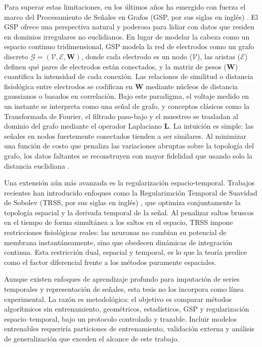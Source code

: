 Para superar estas limitaciones, en los últimos años ha emergido con fuerza el marco del Procesamiento de Señales en Grafos (GSP, por sus siglas en inglés) \cite{shuman2013,ortega2018}. El GSP ofrece una perspectiva natural y poderosa para lidiar con datos que residen en dominios irregulares no euclidianos. En lugar de modelar la cabeza como un espacio continuo tridimensional, GSP modela la red de electrodos como un grafo discreto $\mathcal{G} = (\mathcal{V}, \mathcal{E}, \mathbf{W})$, donde cada electrodo es un nodo ($\mathcal{V}$), las aristas ($\mathcal{E}$) definen qué pares de electrodos están conectados, y la matriz de pesos ($\mathbf{W}$) cuantifica la intensidad de cada conexión. Las relaciones de similitud o distancia fisiológica entre electrodos se codifican en $\mathbf{W}$ mediante núcleos de distancia gaussianos o basados en correlación.
Bajo este paradigma, el voltaje medido en un instante se interpreta como una señal de grafo, y conceptos clásicos como la Transformada de Fourier, el filtrado paso-bajo y el muestreo se trasladan al dominio del grafo mediante el operador Laplaciano $\mathbf{L}$. La intuición es simple: las señales en nodos fuertemente conectados tienden a ser similares. Al minimizar una función de costo que penaliza las variaciones abruptas sobre la topología del grafo, los datos faltantes se reconstruyen con mayor fidelidad que usando solo la distancia euclidiana \cite{narang2013}.

Una extensión aún más avanzada es la regularización espacio-temporal. Trabajos recientes han introducido enfoques como la Regularización Temporal de Suavidad de Sobolev (TRSS, por sus siglas en inglés) \cite{giraldo2022}, que optimiza conjuntamente la topología espacial y la derivada temporal de la señal. Al penalizar saltos bruscos en el tiempo de forma simultánea a los saltos en el espacio, TRSS impone restricciones fisiológicas reales: las neuronas no cambian su potencial de membrana instantáneamente, sino que obedecen dinámicas de integración continua. Esta restricción dual, espacial y temporal, es lo que la teoría predice como el factor diferencial frente a los métodos puramente espaciales.

Aunque existen enfoques de aprendizaje profundo para imputación de series temporales y representación de señales, esta tesis no los incorpora como línea experimental. La razón es metodológica: el objetivo es comparar métodos algorítmicos sin entrenamiento, geométricos, estadísticos, GSP y regularización espacio--temporal, bajo un protocolo controlado y trazable. Incluir modelos entrenables requeriría particiones de entrenamiento, validación externa y análisis de generalización que exceden el alcance de este trabajo.
